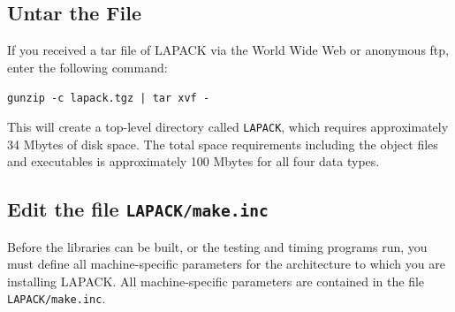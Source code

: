 \documentclass[11pt]{report}
\begin{document}
\begin{enumerate}
%
%
\end{enumerate}
 
\subsection{Untar the File}

If you received a tar file of LAPACK via the World Wide
Web or anonymous ftp, enter the following command:

\begin{list}{}
\item{\texttt{gunzip -c lapack.tgz | tar xvf -}}
\end{list}

\noindent
This will create a top-level directory called \texttt{LAPACK}, which
requires approximately 34 Mbytes of disk space.
The total space requirements including the object files and executables
is approximately 100 Mbytes for all four data types.

\subsection{Edit the file \texttt{LAPACK/make.inc}}

Before the libraries can be built, or the testing and timing programs
run, you must define all machine-specific parameters for the
architecture to which you are installing LAPACK.  All machine-specific
parameters are contained in the file \texttt{LAPACK/make.inc}.
\end{document}
